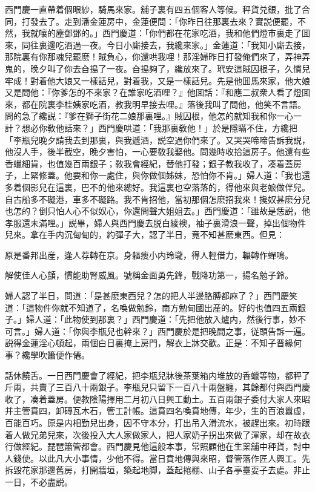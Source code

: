 西門慶一直帶着個眼紗，騎馬來家。舖子裏有四五個客人等候。秤貨兑銀，批了合同，打發去了。走到潘金蓮房中，金蓮便問：「你昨日往那裏去來？實説便罷，不然，我就嚷的塵鄧鄧的。」西門慶道：「你們都在花家吃酒，我和他們燈巿裏走了囬來，同往裏邊吃酒過一夜。今日小廝接去，我纔來家。」金蓮道：「我知小廝去接，那院裏有你那魂兒罷麽！賊負心，你還哄我哩！那淫婦昨日打發俺們來了，弄神弄鬼的，晚夕叫了你去㒲搗了一夜。㒲搗夠了，纔放來了。玳安這賊囚根子，久慣兒牢成！對着他大娘又一樣話兒，對着我，又是一樣話兒。先是他囬馬來家，他大娘又是問他：『你爹怎的不來家？在誰家吃酒哩？』他囬話：『和應二叔衆人看了燈囬來，都在院裏李桂姨家吃酒，教我明早接去哩。』落後我叫了問他，他笑不言語。問的急了纔説：『爹在獅子街花二娘那裏哩。』賊囚根，他怎的就知我和你一心一計？想必你敎他話來？」西門慶哄道：「我那裏敎他！」於是隱瞞不住，方纔把「李瓶兒晚夕請我去到那裏，與我遞酒，説空過你們來了。又哭哭啼啼告訴我説，他沒人手，後半截空，晚夕害怕，一心要敎我娶他。問幾時收拾這房子。他還有些香蠟細貨，也值幾百兩銀子；敎我會經紀，替他打發；銀子教我收了，凑着蓋房子，上緊修蓋。他要和你一處住，與你做個姊妹，恐怕你不肯。」婦人道：「我也還多着個影兒在這裏，巴不的他來總好。我這裏也空落落的，得他來與老娘做伴兒。自古船多不礙港，車多不礙路。我不肯招他，當初那個怎麽招我來！攙奴甚麽分兒也怎的？倒只怕人心不似奴心，你還問聲大姐姐去。」西門慶道：「雖故是恁説，他孝服還未滿哩。」説畢，婦人與西門慶去脱白綾襖，袖子裏滑浪一聲，掉出個物件兒來。拿在手内沉甸甸的，約彈子大，認了半日，竟不知甚麽東西。但見：

原是番邦出産，逢人荐轉在京。身軀瘦小内玲瓏，得人輕借力，輾轉作蟬鳴。

解使佳人心顫，慣能助腎威風。號稱金面勇先鋒，戰降功第一，揚名勉子鈴。

婦人認了半日，問道：「是甚麽東西兒？怎的把人半邊胳膊都麻了？」西門慶笑道：「這物件你就不知道了，名喚做勉鈴，南方勉甸國出産的。好的也值四五兩銀子。」婦人道：「此物使到那裏？」西門慶道：「先把他放入爐内，然後行事，妙不可言。」婦人道：「你與李瓶兒也幹來？」西門慶於是把晚間之事，従頭告訴一遍。説得金蓮淫心頓起，兩個白日裏掩上房門，解衣上牀交歡。正是：不知子晋緣何事？纔學吹簫便作僊。

話休饒舌。一日西門慶會了經紀，把李瓶兒牀後茶葉箱内堆放的香蠟等物，都秤了斤兩，共賣了三百八十兩銀子。李瓶兒只留下一百八十兩盤纏，其餘都付與西門慶收了，凑着蓋房。便教陰陽擇用二月初八日興工動土。五百兩銀子委付大家人來昭并主管賁四，卸磚瓦木石，管工計帳。這賁四名喚賁地傳，年少，生的百浪囂虚，百能百巧。原是内相勤兒出身，因不守本分，打出吊入滑流水，被趕出來。初時跟着人做兄弟兒來，次後投入大人家做家人，把人家奶子拐出來做了渾家，却在故衣行做經紀。琵琶簫管都會。西門慶見他這般本事，常照顧他在生薬舖中秤貨，討中人錢使。以此凡大小事情，少他不得。當日賁地傳與來昭，督管落作匠人興工。先拆毀花家那邊舊房，打開牆垣，築起地脚，蓋起捲棚、山子各亭臺耍子去處。非止一日，不必盡説。

